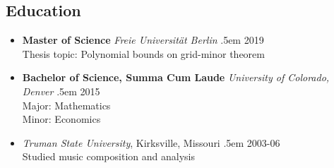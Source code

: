 \documentclass[a4paper]{article}
\makeatletter
\newcommand \brentfill {
  \tiny
  \leavevmode \cleaders 
  \hb@xt@ .5em{\hss \textperiodcentered \hss }\hfill \kern \z@
  \normalsize
}
\newcommand{\bbull}{\ding{118}}
\makeatother
\begin{document}
\subsection*{Education \hrulefill}
\begin{itemize}
  \item[\bbull] \textbf{Master of Science} \emph{Freie
    Universit\"at Berlin} \brentfill{} 2019\\
    Thesis topic:  Polynomial bounds on grid-minor theorem
  \item[\bbull] \textbf{Bachelor of Science, Summa Cum Laude} \emph{University
      of Colorado, Denver} \brentfill{} 2015\\
    Major:  Mathematics \\
    Minor: Economics
  \item[\bbull] \emph{Truman State University}, Kirksville,
    Missouri \brentfill{} 2003-06\\
    Studied music composition and analysis
\end{itemize}
\end{document}
